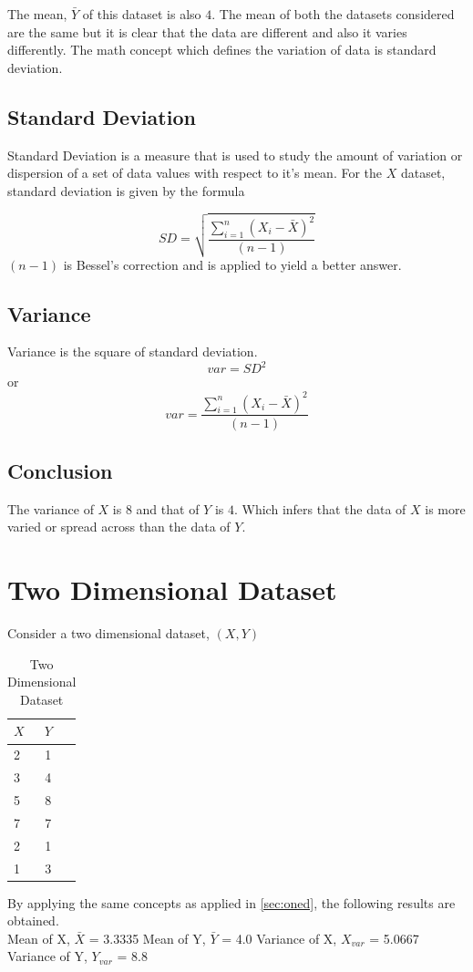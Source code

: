 \documentclass[a4paper]{article}
\begin{document}
The mean, $\bar{Y}$ of this dataset is also $4$. The mean of both the datasets considered are the same but it is clear that the data are different and also it varies differently. The math concept which defines the variation of data is standard deviation.
\subsection{Standard Deviation}
Standard Deviation is a measure that is used to study the amount of variation or dispersion of a set of data values with respect to it's mean. For the $X$ dataset, standard deviation is given by the formula

$$SD = \sqrt{\frac{ \sum_ {i=1}^n {(X_i-\bar{X})^2}}{(n-1)}}$$
$(n-1)$ is Bessel's correction and is applied to yield a better answer.
\subsection{Variance}
Variance is the square of standard deviation.
$$var = SD^2$$
or
$$var={\frac{ \sum_ {i=1}^n {(X_i-\bar{X})^2}}{(n-1)}}$$
\subsection{Conclusion}
The variance of $X$ is 8 and that of  $Y$ is $4$. Which infers that the data of $X$ is more varied or spread across than the data of $Y$.

\section{Two Dimensional Dataset}
Consider a two dimensional dataset, $(X,Y)$

\begin{table}[h!]
\centering
\caption{Two Dimensional Dataset}
\label{tab:xydata}
\begin{tabular}{l c r}\\
$X$ & $Y$ \\ \hline
2 & 1 \\
3 & 4 \\
5 & 8 \\
7 & 7 \\
2 & 1 \\
1 & 3 
\end{tabular}
\end{table}

By applying the same concepts as applied in \ref{sec:oned}, the following results are obtained.\\
\parskip 0pt 
Mean of X,		$\bar{X}$ = 3.3335
\parskip 0pt 
Mean of Y,		$\bar{Y}$ = 4.0
\parskip 0pt 
Variance of X,		$X_{var}$ = 5.0667
\parskip 0pt 
Variance of Y,		$Y_{var}$ = 8.8\\
\end{document}
